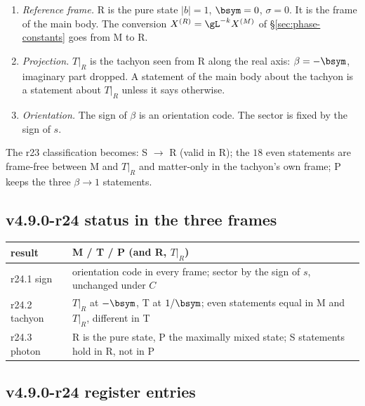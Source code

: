 \begin{enumerate}[leftmargin=2em]
\item[(F5)] \emph{Reference frame.}  R is the pure state \(|b|=1\), \(\bsym=0\), \(\sigma=0\).  It is the frame of the main body.  The
conversion \(X^{(R)}=\gL^{-k}X^{(M)}\) of \S\ref{sec:phase-constants} goes from M to R.
\item[(F6)] \emph{Projection.}  \(T|_R\) is the tachyon seen from R along the real axis: \(\beta=-\bsym\), imaginary part dropped.  A
statement of the main body about the tachyon is a statement about \(T|_R\) unless it says otherwise.
\item[(F7)] \emph{Orientation.}  The sign of \(\beta\) is an orientation code.  The sector is fixed by the sign of \(s\).
\end{enumerate}
The r23 classification becomes: S \(\to\) R (valid in R); the \(18\) even statements are frame-free between M and \(T|_R\) and
matter-only in the tachyon's own frame; P keeps the three \(\beta\to1\) statements.

\subsection*{v4.9.0-r24 status in the three frames}
\label{subsec:v490-r24-frames}

\begin{center}
\small
\begin{tabular}{@{}>{\raggedright\arraybackslash}p{}>{\raggedright\arraybackslash}p{}@{}}
\toprule
result & M / T / P (and R, \(T|_R\))\\
\midrule
r24.1 sign & orientation code in every frame; sector by the sign of \(s\), unchanged under \(C\)\\
r24.2 tachyon & \(T|_R\) at \(-\bsym\), T at \(1/\bsym\); even statements equal in M and \(T|_R\), different in T\\
r24.3 photon & R is the pure state, P the maximally mixed state; S statements hold in R, not in P\\
\bottomrule
\end{tabular}
\end{center}

\subsection*{v4.9.0-r24 register entries}
\label{subsec:v490-r24-register}

